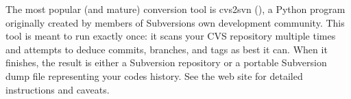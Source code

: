The most popular (and mature) conversion tool is cvs2svn
(\href{https://github.com/mhagger/cvs2svn/}{}), a Python program
originally created by members of Subversion\textquotesingle s own
development community. This tool is meant to run exactly once: it scans
your CVS repository multiple times and attempts to deduce commits,
branches, and tags as best it can. When it finishes, the result is
either a Subversion repository or a portable Subversion dump file
representing your code\textquotesingle s history. See the web site for
detailed instructions and caveats.

